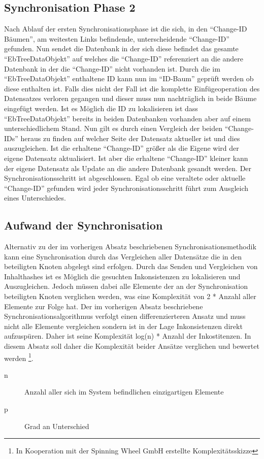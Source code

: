\documentclass[a4paper,11pt,oneside,%
headsepline,												%
footsepline,												%
bibtotocnumbered									%
]{scrreprt}
\begin{document}

\subsection{Synchronisation Phase 2}
Nach Ablauf der ersten Synchronisationsphase ist die sich, in den \enquote{Change-ID Bäumen}, am weitesten Links befindende, unterscheidende \enquote{Change-ID} gefunden. Nun sendet die Datenbank in der sich diese befindet das gesamte \enquote{EbTreeDataObjekt} auf welches die \enquote{Change-ID} referenziert an die andere Datenbank in der die \enquote{Change-ID} nicht vorhanden ist. Durch die im \enquote{EbTreeDataObjekt} enthaltene \ac{ID} kann nun im  \enquote{ID-Baum} geprüft werden ob diese enthalten ist. Falls dies nicht der Fall ist die komplette Einfügeoperation des Datensatzes verloren gegangen und dieser muss nun nachträglich in beide Bäume eingefügt werden. Ist es Möglich die \ac{ID} zu lokalisieren ist dass \enquote{EbTreeDataObjekt} bereits in beiden Datenbanken vorhanden aber auf einem unterschiedlichem Stand. Nun gilt es durch einen Vergleich der beiden \enquote{Change-IDs} heraus zu finden auf welcher Seite der Datensatz aktueller ist und dies auszugleichen. Ist die erhaltene \enquote{Change-ID} größer als die Eigene wird der eigene Datensatz aktualisiert. Ist aber die erhaltene \enquote{Change-ID} kleiner kann der eigene Datensatz als Update an die andere Datenbank gesandt werden. Der Synchronisationsschritt ist abgeschlossen. Egal ob eine veraltete oder aktuelle  \enquote{Change-ID} gefunden wird jeder Synchronisationsschritt führt zum Ausgleich eines Unterschiedes.

\subsection{Aufwand der Synchronisation}
Alternativ zu der im vorherigen Absatz beschriebenen Synchronisationsmethodik kann eine Synchronisation durch das Vergleichen aller Datensätze die in den beteiligten Knoten abgelegt sind erfolgen. Durch das Senden und Vergleichen von Inhalthashes ist es Möglich die gesuchten Inkonsistenzen zu lokalisieren und Auszugleichen. Jedoch müssen dabei alle Elemente der an der Synchronisation beteiligten Knoten verglichen werden, was eine Komplexität von 2 * Anzahl aller Elemente zur Folge hat. Der im vorherigen Absatz beschriebene Synchronisationsalgorithmus verfolgt einen differenzierteren Ansatz und muss nicht alle Elemente vergleichen sondern ist in der Lage Inkonsistenzen direkt aufzuspüren. Daher ist seine Komplexität log(n) *  Anzahl der Inkostitenzen. In diesem Absatz soll daher die Komplexität beider Ansätze verglichen und bewertet werden \footnote{In Kooperation mit der Spinning Wheel GmbH erstellte Komplexitätsskizze}.
\begin{description}
   \item[n ] Anzahl aller sich im System befindlichen einzigartigen Elemente
   \item[p] Grad an Unterschied 
\end{description}
\end{document}
